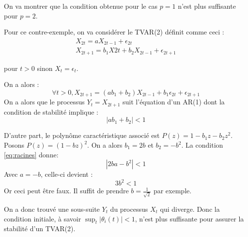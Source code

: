 \documentclass{report}
\begin{document}
On va montrer que la condition obtenue pour le cas $p=1$ n'est plus suffisante pour $p=2$.

Pour ce contre-exemple, on va considérer le TVAR(2) définit comme ceci :
\begin{align*}
X_{2t} = a X_{2t-1} + \epsilon_{2t} \\
X_{2t+1} = b_1 X{2t} + b_2 X_{2t-1} + \epsilon_{2t+1}
\end{align*}

pour $t>0$ sinon $X_t = \epsilon_t$.

On a alors :
$$
\forall t>0, X_{2t+1} = (ab_1 + b_2) X_{2t-1} + b_1 \epsilon_{2t} + \epsilon_{2t+1}
$$
On a alors que le processus $Y_t = X_{2t+1}$ suit l'équation d'un AR(1) dont la condition de stabilité implique :
\begin{equation} \label{eq:racines}
|ab_1 + b_2| < 1
\tag{*}
\end{equation}

D'autre part, le polynôme caractéristique associé est $P(z) = 1 - b_1 z - b_2 z^2$. Posons $P(z) = (1-bz)^2$. On a alors $b_1 = 2b$ et $b_2 = -b^2$.
La condition \eqref{eq:racines} donne:
$$
|2ba-b^2| <1
$$
Avec $a = -b$, celle-ci devient :
$$
3b^2 < 1
$$
Or ceci peut être faux. Il suffit de prendre $b=\frac{1}{\sqrt{2}}$ par exemple.

On a donc trouvé une sous-suite $Y_t$ du processus $X_t$ qui diverge. Donc la condition initiale, à savoir $\sup_t|\theta_i(t)|<1$, n'est plus suffisante pour assurer la stabilité d'un TVAR(2).
\end{document}
